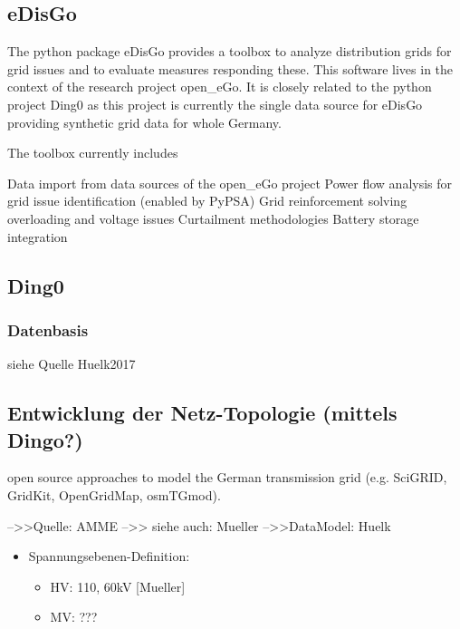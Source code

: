\documentclass[
a4paper,     %
12pt         %
]{scrartcl}  %
\begin{document}
\subsection{eDisGo}
The python package eDisGo provides a toolbox to analyze distribution grids for grid issues and to evaluate measures responding these. This software lives in the context of the research project open\_eGo. It is closely related to the python project Ding0 as this project is currently the single data source for eDisGo providing synthetic grid data for whole Germany.

The toolbox currently includes

Data import from data sources of the open\_eGo project
Power flow analysis for grid issue identification (enabled by PyPSA)
Grid reinforcement solving overloading and voltage issues
Curtailment methodologies
Battery storage integration


\subsection{Ding0}
\subsubsection{Datenbasis}
siehe Quelle Huelk2017
\subsection{Entwicklung der Netz-Topologie (mittels Dingo?)}
\label{netz-topo_dingo}
open source approaches to model
the German transmission grid (e.g. SciGRID, GridKit, OpenGridMap, osmTGmod).

-->>Quelle: AMME
-->> siehe auch: Mueller
-->>DataModel: Huelk
\begin{itemize}
	\item[] Spannungsebenen-Definition:
	\begin{itemize}
		\item HV: 110, 60kV [Mueller]
		\item MV: ???
	\end{itemize}

\end{itemize}
\end{document}
